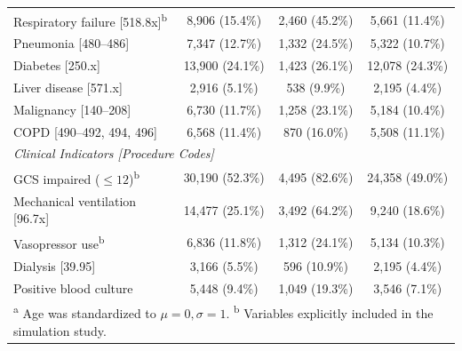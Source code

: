 \documentclass[twoside,11pt]{article}
\begin{document}
\begin{table}[ht!]
\begin{tabular}{l c c c}
\quad Respiratory failure [518.8x]\textsuperscript{b} & 8,906 (15.4\%) & 2,460 (45.2\%) & 5,661 (11.4\%) \\
\quad Pneumonia [480--486] & 7,347 (12.7\%) & 1,332 (24.5\%) & 5,322 (10.7\%) \\
\quad Diabetes [250.x] & 13,900 (24.1\%) & 1,423 (26.1\%) & 12,078 (24.3\%) \\
\quad Liver disease [571.x] & 2,916 (5.1\%) & 538 (9.9\%) & 2,195 (4.4\%) \\
\quad Malignancy [140--208] & 6,730 (11.7\%) & 1,258 (23.1\%) & 5,184 (10.4\%) \\
\quad COPD [490--492, 494, 496] & 6,568 (11.4\%) & 870 (16.0\%) & 5,508 (11.1\%) \\
\midrule
\multicolumn{4}{l}{\textit{Clinical Indicators [Procedure Codes]}} \\
\quad GCS impaired ($\leq 12$)\textsuperscript{b} & 30,190 (52.3\%) & 4,495 (82.6\%) & 24,358 (49.0\%) \\
\quad Mechanical ventilation [96.7x] & 14,477 (25.1\%) & 3,492 (64.2\%) & 9,240 (18.6\%) \\
\quad Vasopressor use\textsuperscript{b} & 6,836 (11.8\%) & 1,312 (24.1\%) & 5,134 (10.3\%) \\
\quad Dialysis [39.95] & 3,166 (5.5\%) & 596 (10.9\%) & 2,195 (4.4\%) \\
\quad Positive blood culture & 5,448 (9.4\%) & 1,049 (19.3\%) & 3,546 (7.1\%) \\
\bottomrule
\multicolumn{4}{l}{\scriptsize \textsuperscript{a} Age was standardized to $\mu=0, \sigma=1$. \textsuperscript{b} Variables explicitly included in the simulation study.} \\
\end{tabular}
\end{table}

\newpage

\end{document}
